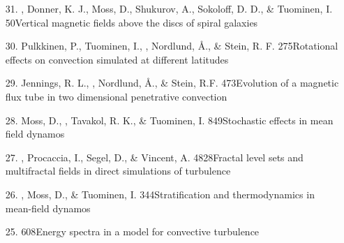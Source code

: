 \begin{itemize}
\item[31.]
\Brandenburg, Donner, K. J., Moss, D., Shukurov, A., Sokoloff, D. D.,
\& Tuominen, I.
{50}{Vertical magnetic fields above the discs of spiral galaxies}

\item[30.]
Pulkkinen, P., Tuominen, I., \Brandenburg, Nordlund,
\AA., \& Stein, R. F.
{275}{Rotational effects on convection simulated at different latitudes}

\item[29.]
Jennings, R. L., \Brandenburg, Nordlund, \AA., \& Stein, R.F.
{473}{Evolution of a magnetic flux tube in two dimensional penetrative
convection}

\item[28.]
Moss, D., \Brandenburg, Tavakol, R. K., \& Tuominen, I.
{849}{Stochastic effects in mean field dynamos}

\item[27.]
\Brandenburg, Procaccia, I., Segel, D., \& Vincent, A.
{4828}{Fractal level sets and multifractal fields
in direct simulations of turbulence}

\item[26.]
\Brandenburg, Moss, D., \& Tuominen, I.
{344}{Stratification and thermodynamics in mean-field dynamos}

\item[25.]
\Brandenburg{}
{608}{Energy spectra in a model for convective turbulence}


\end{itemize}
